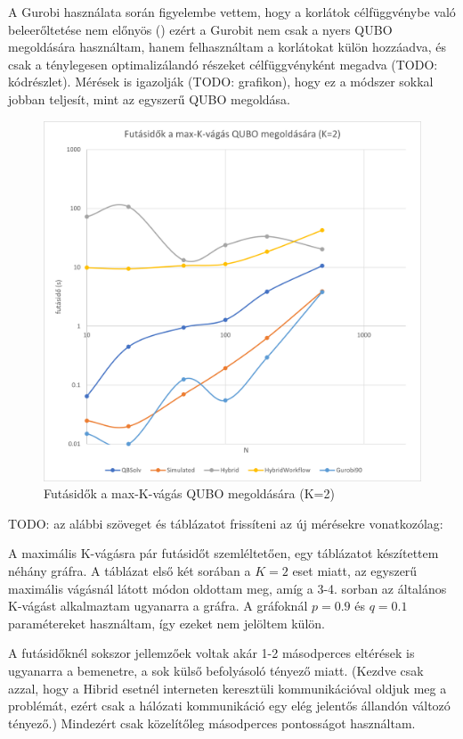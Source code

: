 A Gurobi használata során figyelembe vettem, hogy a korlátok célfüggvénybe való beleerőltetése nem előnyös () ezért a Gurobit nem csak a nyers QUBO megoldására használtam, hanem felhasználtam a korlátokat külön hozzáadva, és csak a ténylegesen optimalizálandó részeket célfüggvényként megadva (TODO: kódrészlet). Mérések is igazolják (TODO: grafikon), hogy ez a módszer sokkal jobban teljesít, mint az egyszerű QUBO megoldása.

\begin{figure}[!ht]
	\centering
	\includegraphics[width=150mm, keepaspectratio]{figures/diagrams/maxKCutQUBO_K2.png}
	\caption{Futásidők a max-K-vágás QUBO megoldására (K=2)}
	\label{fig:maxKCutQUBO_K2}
\end{figure}

TODO: az alábbi szöveget és táblázatot 
frissíteni az új mérésekre vonatkozólag:

A maximális K-vágásra pár futásidőt szemléltetően, egy táblázatot készítettem néhány gráfra. A táblázat első két sorában a $K=2$ eset miatt, az egyszerű maximális vágásnál látott módon oldottam meg, amíg a 3-4. sorban az általános K-vágást alkalmaztam ugyanarra a gráfra. A gráfoknál $p=0.9$ és $q=0.1$ paramétereket használtam, így ezeket nem jelöltem külön.

A futásidőknél sokszor jellemzőek voltak akár 1-2 másodperces eltérések is ugyanarra a bemenetre, a sok külső befolyásoló tényező miatt. (Kezdve csak azzal, hogy a Hibrid esetnél interneten keresztüli kommunikációval oldjuk meg a problémát, ezért csak a hálózati kommunikáció egy elég jelentős állandón változó tényező.) Mindezért csak közelítőleg másodperces pontosságot használtam.



